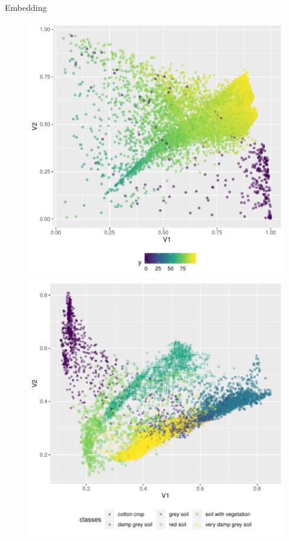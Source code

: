 \documentclass[13.5pt,aspectratio=169]{beamer}
\begin{document}
\begin{frame}{Embedding}
\begin{figure}[ht]
{           }
           \label{fig:visualizer}
       \end{figure}
     \begin{figure}[ht!]
        \centering
     \includegraphics[width=.4\linewidth]{images/visualization_cpu}%
     \includegraphics[width=.4\linewidth]{images/visualization_sat2}
        \label{fig:visualizations}
     \end{figure}
     \end{frame}
\end{document}

